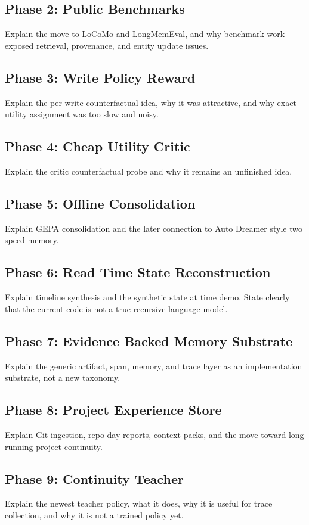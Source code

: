 \documentclass[11pt]{article}
\begin{document}
\subsection{Phase 2: Public Benchmarks}
Explain the move to LoCoMo and LongMemEval, and why benchmark work exposed retrieval, provenance, and entity update issues.

\subsection{Phase 3: Write Policy Reward}
Explain the per write counterfactual idea, why it was attractive, and why exact utility assignment was too slow and noisy.

\subsection{Phase 4: Cheap Utility Critic}
Explain the critic counterfactual probe and why it remains an unfinished idea.

\subsection{Phase 5: Offline Consolidation}
Explain GEPA consolidation and the later connection to Auto Dreamer style two speed memory.

\subsection{Phase 6: Read Time State Reconstruction}
Explain timeline synthesis and the synthetic state at time demo. State clearly that the current code is not a true recursive language model.

\subsection{Phase 7: Evidence Backed Memory Substrate}
Explain the generic artifact, span, memory, and trace layer as an implementation substrate, not a new taxonomy.

\subsection{Phase 8: Project Experience Store}
Explain Git ingestion, repo day reports, context packs, and the move toward long running project continuity.

\subsection{Phase 9: Continuity Teacher}
Explain the newest teacher policy, what it does, why it is useful for trace collection, and why it is not a trained policy yet.
\end{document}
